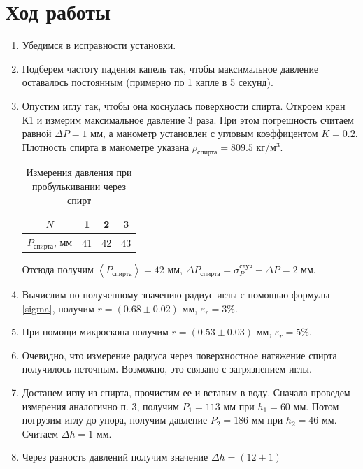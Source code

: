 \documentclass[12pt]{article}
\begin{document}
    \section{Ход работы}
    \begin{enumerate}
        \item Убедимся в исправности установки.
        \item Подберем частоту падения капель так, чтобы максимальное 
        давление оставалось постоянным (примерно по 1 капле в 5 секунд).
        \item Опустим иглу так, чтобы она коснулась поверхности спирта.
        Откроем кран К1 и измерим максимальное давление 3 раза. При этом
        погрешность считаем равной $\Delta P = 1$ мм, а манометр установлен
        с угловым коэффицентом $K = 0.2$. Плотность спирта в манометре 
        указана $\rho_{\text{спирта}} = 809.5$ кг/м$^3$.
        \begin{table}[H]
            \centering
            \begin{tabular}{|c|c|c|c|}
                \hline
                $N$ & 1 & 2 & 3 \\ \hline
                $P_{\text{спирта}}$, мм & 41 & 42 & 43 \\ \hline
            \end{tabular}
            \caption{Измерения давления при пробулькивании через спирт}
        \end{table}
        Отсюда получим $\left<P_{\text{спирта}}\right> = 42$ мм, $\Delta P_
        {\text{спирта}} = \sigma_P^{\text{случ}} + \Delta P = 2 $ мм.
        \item Вычислим по полученному значению радиус иглы с помощью
        формулы \ref{sigma}, получим $r = (0.68 \pm 0.02)$ мм,
        $\varepsilon_r = 3$\%. 
        \item При помощи микроскопа получим $r = (0.53\pm 0.03)$ мм, 
        $\varepsilon_r = 5$\%.
        \item Очевидно, что измерение радиуса через поверхностное натяжение
        спирта получилось неточным. Возможно, это связано с загрязнением
        иглы.  
        \item Достанем иглу из спирта, прочистим ее и вставим в воду.
        Сначала проведем измерения аналогично п. 3, получим $P_1 = 
        113$ мм при $h_1 = 60$ мм. Потом погрузим иглу до упора, получим 
        давление $P_2 = 186$ мм при $h_2 = 46$ мм. Считаем $\Delta h = 1$ мм.
        \item Через разность давлений получим значение $\Delta h = (12 \pm 1)$ 

\end{enumerate}
\end{document}
